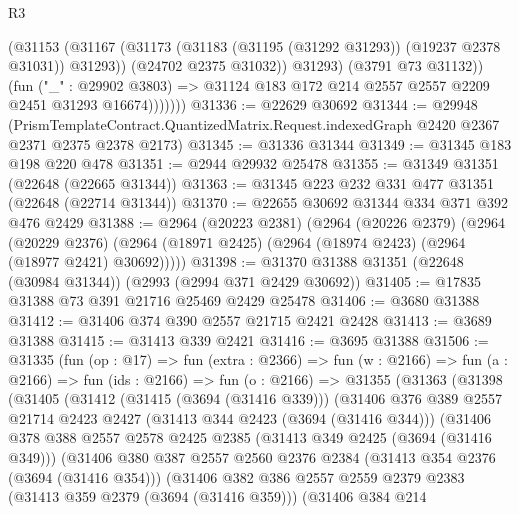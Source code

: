 \begin{lexlean}{R3}
\begin{coremodule}
                    (@31153
                      (@31167
                        (@31173 (@31183 (@31195 (@31292 @31293)) (@19237 @2378 @31031)) @31293))
                      (@24702 @2375 @31032))
                    @31293)
                  (@3791 @73 @31132))
                (fun ("_" : @29902 @3803) =>
                @31124 @183 @172 @214 @2557 @2557 @2209 @2451 @31293 @16674)))))))
@31336 := @22629 @30692
@31344 := @29948
    (PrismTemplateContract.QuantizedMatrix.Request.indexedGraph @2420 @2367 @2371 @2375 @2378 @2173)
@31345 := @31336 @31344
@31349 := @31345 @183 @198 @220 @478
@31351 := @2944 @29932 @25478
@31355 := @31349 @31351 (@22648 (@22665 @31344))
@31363 := @31345 @223 @232 @331 @477 @31351 (@22648 (@22714 @31344))
@31370 := @22655 @30692 @31344 @334 @371 @392 @476 @2429
@31388 := @2964
    (@20223 @2381)
    (@2964
      (@20226 @2379)
      (@2964
        (@20229 @2376)
        (@2964 (@18971 @2425) (@2964 (@18974 @2423) (@2964 (@18977 @2421) @30692)))))
@31398 := @31370 @31388 @31351 (@22648 (@30984 @31344)) (@2993 (@2994 @371 @2429 @30692))
@31405 := @17835 @31388 @73 @391 @21716 @25469 @2429 @25478
@31406 := @3680 @31388
@31412 := @31406 @374 @390 @2557 @21715 @2421 @2428
@31413 := @3689 @31388
@31415 := @31413 @339 @2421
@31416 := @3695 @31388
@31506 := @31335
    (fun (op : @17) =>
    fun (extra : @2366) =>
    fun (w : @2166) =>
    fun (a : @2166) =>
    fun (ids : @2166) =>
    fun (o : @2166) =>
    @31355
      (@31363
        (@31398
          (@31405
            (@31412
              (@31415 (@3694 (@31416 @339)))
              (@31406
                @376
                @389
                @2557
                @21714
                @2423
                @2427
                (@31413 @344 @2423 (@3694 (@31416 @344)))
                (@31406
                  @378
                  @388
                  @2557
                  @2578
                  @2425
                  @2385
                  (@31413 @349 @2425 (@3694 (@31416 @349)))
                  (@31406
                    @380
                    @387
                    @2557
                    @2560
                    @2376
                    @2384
                    (@31413 @354 @2376 (@3694 (@31416 @354)))
                    (@31406
                      @382
                      @386
                      @2557
                      @2559
                      @2379
                      @2383
                      (@31413 @359 @2379 (@3694 (@31416 @359)))
                      (@31406
                        @384
                        @214

\end{coremodule}
\end{lexlean}
